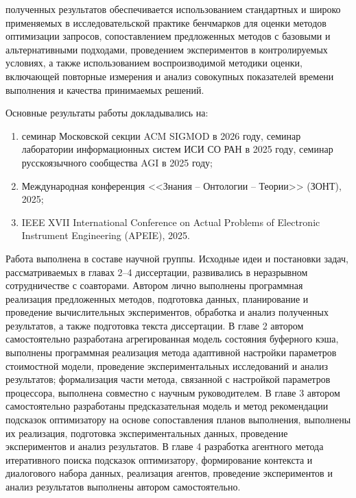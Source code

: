 {\reliability} полученных результатов обеспечивается использованием стандартных и широко применяемых в исследовательской практике бенчмарков для оценки методов оптимизации запросов, сопоставлением предложенных методов с базовыми и альтернативными подходами, проведением экспериментов в контролируемых условиях, а также использованием воспроизводимой методики оценки, включающей повторные измерения и анализ совокупных показателей времени выполнения и качества принимаемых решений.

{\probation}
Основные результаты работы докладывались на:
\begin{enumerate}
    \item семинар Московской секции ACM SIGMOD в 2026 году, семинар лаборатории информационных систем ИСИ СО РАН в 2025 году, семинар русскоязычного сообщества AGI в 2025 году;
    \item Международная конференция <<Знания -- Онтологии -- Теории>> (ЗОНТ), 2025;
    \item IEEE XVII International Conference on Actual Problems of Electronic Instrument Engineering (APEIE), 2025.
\end{enumerate}

{\contribution} Работа выполнена в составе научной группы. Исходные идеи и постановки задач, рассматриваемых в главах 2–4 диссертации, развивались в неразрывном сотрудничестве с соавторами. Автором лично выполнены программная реализация предложенных методов, подготовка данных, планирование и проведение вычислительных экспериментов, обработка и анализ полученных результатов, а также подготовка текста диссертации. В главе 2 автором самостоятельно разработана агрегированная модель состояния буферного кэша, выполнены программная реализация метода адаптивной настройки параметров стоимостной модели, проведение экспериментальных исследований и анализ результатов; формализация части метода, связанной с настройкой параметров процессора, выполнена совместно с научным руководителем. В главе 3 автором самостоятельно разработаны предсказательная модель и метод рекомендации подсказок оптимизатору на основе сопоставления планов выполнения, выполнены их реализация, подготовка экспериментальных данных, проведение экспериментов и анализ результатов. В главе 4 разработка агентного метода итеративного поиска подсказок оптимизатору, формирование контекста и диалогового набора данных, реализация агентов, проведение экспериментов и анализ результатов выполнены автором самостоятельно.

